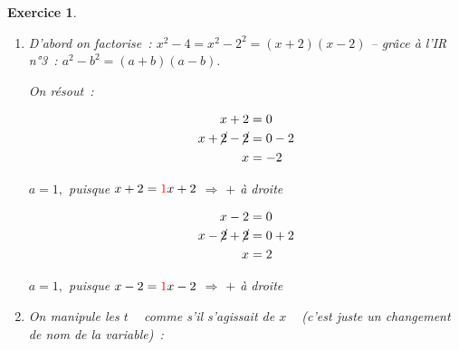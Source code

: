\documentclass[10pt]{article}
\newtheorem{exo}{Exercice}
\begin{document}
\begin{exo}
\begin{enumerate}
\begin{enumerate}
\begin{multicols}{2}
$a=1,$ puisque $x=\textcolor{red}{1}x+0$ $\Rightarrow$ $+$ à droite

\columnbreak



\begin{align*}
x-3&=0\\
x-\cancel{3}+\cancel{3}&=0+3\\
 x&=3
 \end{align*}
 
 $a=1,$ puisque $x-3=\textcolor{red}{1}x-3$ $\Rightarrow$ $+$ à droite

\end{multicols}


\begin{center}
\end{center}

\item D'abord on factorise~: $x^2-4=x^2-2^2=(x+2)(x-2)$ -- grâce à l'IR n°3~: $a^2-b^2=(a+b)(a-b).$

\setlength{\columnseprule}{1pt}

\begin{multicols}{2}

On résout~:

\begin{align*}
x+2&=0\\
x+\cancel{2}-\cancel{2}&=0-2\\
 x&=-2
\end{align*}

 $a=1,$ puisque $x+2=\textcolor{red}{1}x+2$ $\Rightarrow$ $+$ à droite

\columnbreak


\begin{align*}
x-2&=0\\
x-\cancel{2}+\cancel{2}&=0+2\\
 x&=2
 \end{align*}
 
 $a=1,$ puisque $x-2=\textcolor{red}{1}x-2$ $\Rightarrow$ $+$ à droite

\end{multicols}


\begin{center}
\end{center}
\item On manipule les \og $t$ \fg~{} comme s'il s'agissait de  \og $x$ \fg~{} (c'est juste un changement de nom de la variable)~:


\end{enumerate}
\end{enumerate}
\end{exo}
\end{document}
